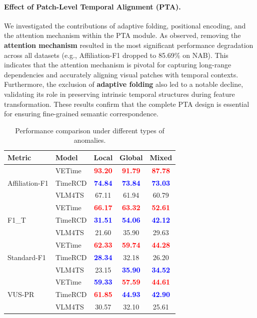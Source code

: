 \documentclass{article}
\theoremstyle{plain}
\theoremstyle{definition}
\theoremstyle{remark}
\begin{document}
\paragraph{Effect of Patch-Level Temporal Alignment (PTA).}
We investigated the contributions of adaptive folding, positional encoding, and the attention mechanism within the PTA module. As observed, removing the \textbf{attention mechanism} resulted in the most significant performance degradation across all datasets (e.g., Affiliation-F1 dropped to 85.69\% on NAB). This indicates that the attention mechanism is pivotal for capturing long-range dependencies and accurately aligning visual patches with temporal contexts. Furthermore, the exclusion of \textbf{adaptive folding} also led to a notable decline, validating its role in preserving intrinsic temporal structures during feature transformation. These results confirm that the complete PTA design is essential for ensuring fine-grained semantic correspondence.


\begin{table}[b!]
\centering
\small
\caption{Performance comparison under different types of anomalies.}
\label{tab:tab10}
\begin{tabular}{llccc}
\toprule
\textbf{Metric} & \textbf{Model} & \textbf{Local} & \textbf{Global} & \textbf{Mixed} \\
\midrule
\multirow{3}{*}{Affiliation-F1} 
& VETime    & \textcolor{red}{\textbf{93.20}} & \textcolor{red}{\textbf{91.79}} & \textcolor{red}{\textbf{87.78}} \\
& TimeRCD    & \textcolor{blue}{\textbf{74.84}}&\textcolor{blue}{\textbf{73.84}}&\textcolor{blue}{\textbf{73.03}}\\
& VLM4TS & 67.11&61.94&60.79
 \\

\midrule
\multirow{3}{*}{F1\_T} 
& VETime    & \textcolor{red}{\textbf{66.17}} & \textcolor{red}{\textbf{63.32}} & \textcolor{red}{\textbf{52.61}} \\
& TimeRCD    & \textcolor{blue}{\textbf{31.51}}&\textcolor{blue}{\textbf{54.06}}&	\textcolor{blue}{\textbf{42.12}} \\
& VLM4TS & 21.60&35.90&29.63 \\

\midrule
\multirow{3}{*}{Standard-F1} 
& VETime    & \textcolor{red}{\textbf{62.33}} & \textcolor{red}{\textbf{59.74}} & \textcolor{red}{\textbf{44.28}} \\
& TimeRCD    & \textcolor{blue}{\textbf{28.34}}&32.18&26.20\\
& VLM4TS & 23.15&\textcolor{blue}{\textbf{35.90}}&\textcolor{blue}{\textbf{34.52}} \\
\midrule
\multirow{3}{*}{VUS-PR} 
& VETime    & \textcolor{blue}{\textbf{59.33}} & \textcolor{red}{\textbf{57.59}} & \textcolor{red}{\textbf{44.61}} \\
& TimeRCD    & \textcolor{red}{\textbf{61.85}} & \textcolor{blue}{\textbf{44.93}}&\textcolor{blue}{\textbf{42.90}}\\
& VLM4TS &30.57&32.10&25.61 
 \\

\bottomrule
\end{tabular}
\end{table}
\end{document}

